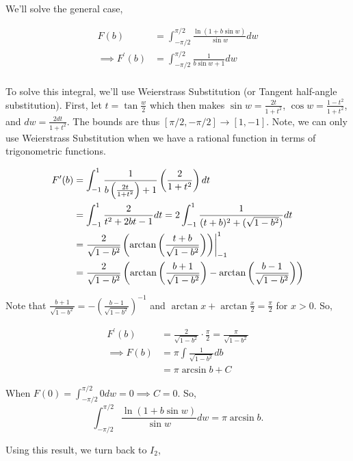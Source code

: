 \documentclass{article}
\begin{document}
We'll solve the general case,

\begin{align*}
    F(b) &= \int_{-\pi/2}^{\pi/2}{\frac{\ln\left( 1 + b\sin{w} \right)}{\sin{w}}dw} \\
    \implies F^\prime(b) &= \int_{-\pi/2}^{\pi/2}{\frac{1}{b\sin w + 1}dw} \\
\end{align*}

To solve this integral, we'll use Weierstrass Substitution (or Tangent half-angle substitution). First, let $t = \tan{\frac{w}{2}}$ which then makes $\sin{w} = \frac{2t}{1+t^2}$, $\cos{w} = \frac{1-t^2}{1+t^2}$, and $dw = \frac{2 dt}{1+t^2}$. The bounds are thus $[\pi/2, -\pi/2] \to [1, -1]$. Note, we can only use Weierstrass Substitution when we have a rational function in terms of trigonometric functions. 

\begin{align*}
    F^\prime(b) &= \int_{-1}^{1}{\frac{1}{b\left( \frac{2t}{1+t^2} \right) + 1} \left( \frac{2}{1+t^2} \right)dt} \\
    &= \int_{-1}^{1}{\frac{2}{t^2 + 2bt - 1}dt} = 2\int_{-1}^{1}{\frac{1}{(t + b)^2 + (\sqrt{1 - b^2})} dt} \\
    &= \frac{2}{\sqrt{1-b^2}}\evalat*{\left(\arctan\left(\frac{t + b}{\sqrt{1 - b^2}} \right)\right)}{1}_{-1} \\
    &= \frac{2}{\sqrt{1 - b^2}}\left( \arctan\left(\frac{b + 1}{\sqrt{1 - b^2}} \right) - \arctan\left(\frac{b - 1}{\sqrt{1 - b^2}} \right) \right)
\end{align*}

Note that $\frac{b + 1}{\sqrt{1 - b^2}} = -\left(\frac{b - 1}{\sqrt{1 - b^2}} \right)^{-1}$ and $\arctan{x} + \arctan{\frac{x}{2}} = \frac{\pi}{2}$ for $x > 0$. So,

\begin{align*}
    F^\prime(b) &= \frac{2}{\sqrt{1-b^2}}\cdot \frac{\pi}{2} = \frac{\pi}{\sqrt{1 - b^2}} \\
    \implies F(b) &= \pi\int{\frac{1}{\sqrt{1 - b^2}}db} \\
    &= \pi\arcsin{b} + C
\end{align*}

When $F(0) = \int_{-\pi/2}^{\pi/2}{0dw} = 0 \implies C = 0$. So,
$$
\int_{-\pi/2}^{\pi/2}{\frac{\ln\left( 1 + b\sin{w} \right)}{\sin{w}}dw} = \pi\arcsin{b}.
$$

Using this result, we turn back to $I_2$,
\end{document}
